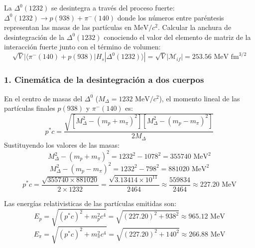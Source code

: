 \begin{problema}
La $\Delta^0(1232)$ se desintegra a través del proceso fuerte: $\Delta^0(1232) \rightarrow p(938) + \pi^-(140)$ donde los números entre paréntesis representan las masas de las partículas en $\text{MeV}/c^2$. Calcular la anchura de desintegración de la $\Delta^0(1232)$ conociendo el valor del elemento de matriz de la interacción fuerte junto con el término de volumen:
\begin{equation*}
\sqrt{V}|\langle \pi^-(140) + p(938) | H_s | \Delta^0(1232) \rangle| = \sqrt{V}|\mathcal{M}_{if}| = 253.56\text{ MeV fm}^{3/2}
\end{equation*}

\tcblower

\subsubsection*{1. Cinemática de la desintegración a dos cuerpos}

En el centro de masas del $\Delta^0$ ($M_\Delta = 1232\text{ MeV}/c^2$), el momento lineal de las partículas finales $p(938)$ y $\pi^-(140)$ es:
\begin{equation*}
p^* c = \frac{\sqrt{[M_\Delta^2 - (m_p + m_\pi)^2][M_\Delta^2 - (m_p - m_\pi)^2]}}{2 M_\Delta}
\end{equation*}
Sustituyendo los valores de las masas:
\begin{equation*}
M_\Delta^2 - (m_p + m_\pi)^2 = 1232^2 - 1078^2 = 355740\text{ MeV}^2
\end{equation*}
\begin{equation*}
M_\Delta^2 - (m_p - m_\pi)^2 = 1232^2 - 798^2 = 881020\text{ MeV}^2
\end{equation*}
\begin{equation*}
p^* c = \frac{\sqrt{355740 \times 881020}}{2 \times 1232} = \frac{\sqrt{3.13414 \times 10^{11}}}{2464} \approx \frac{559834}{2464} \approx 227.20\text{ MeV}
\end{equation*}

Las energías relativisticas de las partículas emitidas son:
\begin{equation*}
E_p = \sqrt{(p^* c)^2 + m_p^2 c^4} = \sqrt{(227.20)^2 + 938^2} \approx 965.12\text{ MeV}
\end{equation*}
\begin{equation*}
E_\pi = \sqrt{(p^* c)^2 + m_\pi^2 c^4} = \sqrt{(227.20)^2 + 140^2} \approx 266.88\text{ MeV}
\end{equation*}


\end{problema}
